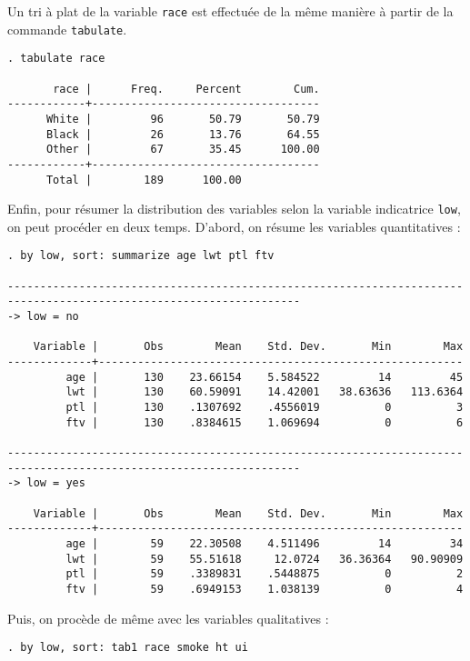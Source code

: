 Un tri à plat de la variable \texttt{race} est effectuée de la même manière
à partir de la commande \verb|tabulate|.
\begin{verbatim}
. tabulate race

       race |      Freq.     Percent        Cum.
------------+-----------------------------------
      White |         96       50.79       50.79
      Black |         26       13.76       64.55
      Other |         67       35.45      100.00
------------+-----------------------------------
      Total |        189      100.00
\end{verbatim}


Enfin, pour résumer la distribution des variables selon la variable
indicatrice \texttt{low}, on peut procéder en deux temps. D'abord, on résume
les variables quantitatives :
\begin{verbatim}
. by low, sort: summarize age lwt ptl ftv

-------------------------------------------------------------------------------------------------------------------
-> low = no

    Variable |       Obs        Mean    Std. Dev.       Min        Max
-------------+--------------------------------------------------------
         age |       130    23.66154    5.584522         14         45
         lwt |       130    60.59091    14.42001   38.63636   113.6364
         ptl |       130    .1307692    .4556019          0          3
         ftv |       130    .8384615    1.069694          0          6

-------------------------------------------------------------------------------------------------------------------
-> low = yes

    Variable |       Obs        Mean    Std. Dev.       Min        Max
-------------+--------------------------------------------------------
         age |        59    22.30508    4.511496         14         34
         lwt |        59    55.51618     12.0724   36.36364   90.90909
         ptl |        59    .3389831    .5448875          0          2
         ftv |        59    .6949153    1.038139          0          4
\end{verbatim}
Puis, on procède de même avec les variables qualitatives :
\begin{verbatim}
. by low, sort: tab1 race smoke ht ui
\end{verbatim}
\label{stop:sol1stata}


